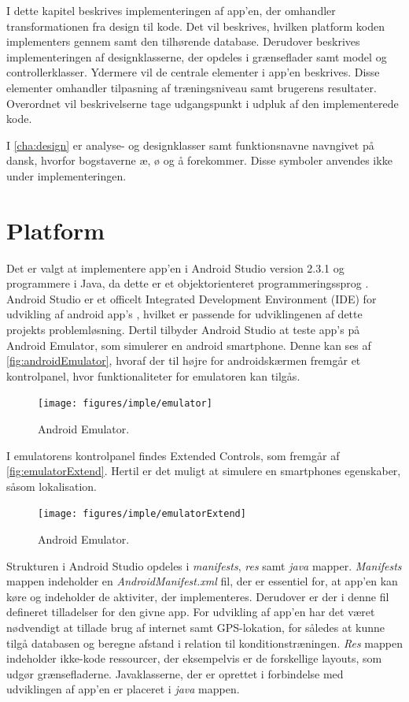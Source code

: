 I dette kapitel beskrives implementeringen af app'en, der omhandler transformationen fra design til kode. Det vil beskrives, hvilken platform koden implementers gennem samt den tilhørende database. Derudover beskrives implementeringen af designklasserne, der opdeles i grænseflader samt model og controllerklasser. Ydermere vil de centrale elementer i app'en beskrives. Disse elementer omhandler tilpasning af træningsniveau samt brugerens resultater. Overordnet vil beskrivelserne tage udgangspunkt i udpluk af den implementerede kode.

I \autoref{cha:design} er analyse- og designklasser samt funktionsnavne navngivet på dansk, hvorfor bogstaverne æ, ø og å forekommer. Disse symboler anvendes ikke under implementeringen.

\section{Platform}
Det er valgt at implementere app'en i Android Studio version 2.3.1 og programmere i Java, da dette er et objektorienteret programmeringssprog \cite{Brahma2015}. Android Studio er et officelt Integrated Development Environment (IDE) for udvikling af android app's \cite{android2017}, hvilket er passende for udviklingenen af dette projekts problemløsning. Dertil tilbyder Android Studio at teste app's på Android Emulator, som simulerer en android smartphone. Denne kan ses af \autoref{fig:androidEmulator}, hvoraf der til højre for androidskærmen fremgår et kontrolpanel, hvor funktionaliteter for emulatoren kan tilgås. 

\begin{figure} [H]
\centering
\texttt{[image: figures/imple/emulator]}
\caption{Android Emulator.}
\label{fig:androidEmulator}
\end{figure}

\noindent
I emulatorens kontrolpanel findes Extended Controls, som fremgår af \autoref{fig:emulatorExtend}. Hertil er det muligt at simulere en smartphones egenskaber, såsom lokalisation.

\begin{figure} [H]
\centering
\texttt{[image: figures/imple/emulatorExtend]}
\caption{Android Emulator.}
\label{fig:emulatorExtend}
\end{figure}

\noindent
Strukturen i Android Studio opdeles i \textit{manifests}, \textit{res} samt \textit{java} mapper. \textit{Manifests} mappen indeholder en \textit{AndroidManifest.xml} fil, der er essentiel for, at app'en kan køre og indeholder de aktiviter, der implementeres. Derudover er der i denne fil defineret tilladelser for den givne app. For udvikling af app'en har det været nødvendigt at tillade brug af internet samt GPS-lokation, for således at kunne tilgå databasen og beregne afstand i relation til konditionstræningen. 
\textit{Res} mappen indeholder ikke-kode ressourcer, der eksempelvis er de forskellige layouts, som udgør grænsefladerne.
Javaklasserne, der er oprettet i forbindelse med udviklingen af app'en er placeret i \textit{java} mappen.\cite{android2017}
 
